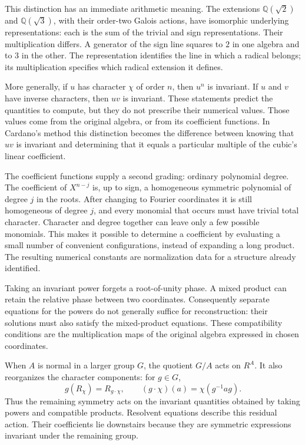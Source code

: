 \documentclass[11pt]{article}
\theoremstyle{remark}
\begin{document}
This distinction has an immediate arithmetic meaning. The extensions \(\mathbb Q(\sqrt2)\) and \(\mathbb Q(\sqrt3)\), with their order-two Galois actions, have isomorphic underlying representations: each is the sum of the trivial and sign representations. Their multiplication differs. A generator of the sign line squares to \(2\) in one algebra and to \(3\) in the other. The representation identifies the line in which a radical belongs; its multiplication specifies which radical extension it defines.

More generally, if \(u\) has character \(\chi\) of order \(n\), then \(u^n\) is invariant. If \(u\) and \(v\) have inverse characters, then \(uv\) is invariant. These statements predict the quantities to compute, but they do not prescribe their numerical values. Those values come from the original algebra, or from its coefficient functions. In Cardano's method this distinction becomes the difference between knowing that \(uv\) is invariant and determining that it equals a particular multiple of the cubic's linear coefficient.

The coefficient functions supply a second grading: ordinary polynomial degree. The coefficient of \(X^{n-j}\) is, up to sign, a homogeneous symmetric polynomial of degree \(j\) in the roots. After changing to Fourier coordinates it is still homogeneous of degree \(j\), and every monomial that occurs must have trivial total character. Character and degree together can leave only a few possible monomials. This makes it possible to determine a coefficient by evaluating a small number of convenient configurations, instead of expanding a long product. The resulting numerical constants are normalization data for a structure already identified.

Taking an invariant power forgets a root-of-unity phase. A mixed product can retain the relative phase between two coordinates. Consequently separate equations for the powers do not generally suffice for reconstruction: their solutions must also satisfy the mixed-product equations. These compatibility conditions are the multiplication maps of the original algebra expressed in chosen coordinates.

When \(A\) is normal in a larger group \(G\), the quotient \(G/A\) acts on \(R^A\). It also reorganizes the character components: for \(g\in G\),
\[
g(R_\chi)=R_{g\cdot\chi},
\qquad
(g\cdot\chi)(a)=\chi(g^{-1}ag).
\]
Thus the remaining symmetry acts on the invariant quantities obtained by taking powers and compatible products. Resolvent equations describe this residual action. Their coefficients lie downstairs because they are symmetric expressions invariant under the remaining group.
\end{document}

